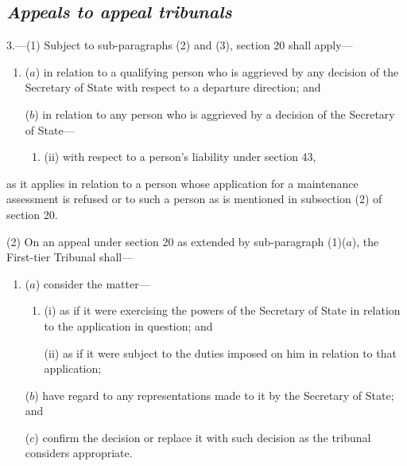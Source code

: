 \documentclass[12pt,a4paper]{article}
\begin{document}
\subsection*{\itshape Appeals to appeal tribunals}

3.---(1) Subject to sub-paragraphs (2) and (3), section 20 shall apply—
\begin{enumerate}\item[]
($a$) in relation to a qualifying person who is aggrieved by any decision of the Secretary of State with respect to a departure direction; and

($b$) in relation to any person who is aggrieved by a decision of the Secretary of State—
\begin{enumerate}\item[]

(ii) with respect to a person’s liability under section 43,
\end{enumerate}
\end{enumerate}
as it applies in relation to a person whose application for a maintenance assessment is refused or to such a person as is mentioned in subsection (2) of section 20.

(2) On an appeal under section 20 as extended by sub-paragraph (1)($a$), 
the First-tier Tribunal  %
shall—
\begin{enumerate}\item[]
($a$) consider the matter—
\begin{enumerate}\item[]
(i) as if it were exercising the powers of the Secretary of State in relation to the application in question; and

(ii) as if it were subject to the duties imposed on him in relation to that application;
\end{enumerate}

($b$) have regard to any representations made to it by the Secretary of State; and

($c$) confirm the decision or replace it with such decision as the tribunal considers appropriate.
\end{enumerate}

\end{document}
